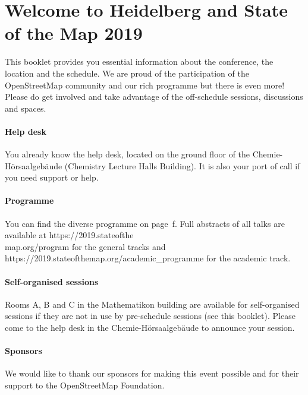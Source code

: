 \newpage
\enlargethispage{1\baselineskip}
\section*{Welcome to Heidelberg and State of the Map 2019} \label{welcome}
This booklet provides you essential information
about the conference, the location and the schedule.  We are proud of the participation of the
OpenStreetMap community and our rich programme but there is even more!  Please do get involved and
take advantage of the off-schedule sessions, discussions and spaces.

\paragraph*{Help desk} \label{welcome-helpdesk}
You already know the help desk, located on the ground floor of the Chemie-Hörsaalgebäude (Chemistry
Lecture Halls Building). It is also your port of call if you need support or help.

\paragraph*{Programme}
You can find the diverse programme on page~\pageref{saturday}f. Full abstracts of all talks are
available at https://2019.stateofthe\\map.org/program for the general tracks and
https://2019.stateofthemap.org/academic\_programme for the academic track.

\paragraph*{Self-organised sessions} \label{welcome-location}
Rooms A, B and C in the Mathematikon building are available for self-organised sessions if they are not in use by pre-schedule sessions (see this booklet). Please come to the help desk in the Chemie-Hörsaalgebäude to announce your session.

\paragraph*{Sponsors} \label{welcome-sponsors}
We would like to thank our sponsors for making this event possible and for their support to the
OpenStreetMap Foundation.
\newpage
